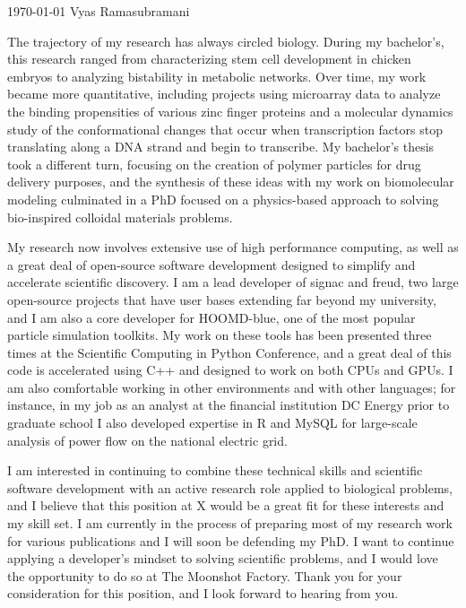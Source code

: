 \documentclass[11pt, a4paper]{awesome-cv}
\begin{document}
\makecvheader[R]

\makecvfooter
  {\today}
  {Vyas Ramasubramani}
  {}

\makelettertitle

\begin{cvletter}
    The trajectory of my research has always circled biology.
    During my bachelor's, this research ranged from characterizing stem cell development in chicken embryos to analyzing bistability in metabolic networks.
    Over time, my work became more quantitative, including projects using microarray data to analyze the binding propensities of various zinc finger proteins and a molecular dynamics study of the conformational changes that occur when transcription factors stop translating along a DNA strand and begin to transcribe.
    My bachelor's thesis took a different turn, focusing on the creation of polymer particles for drug delivery purposes, and the synthesis of these ideas with my work on biomolecular modeling culminated in a PhD focused on a physics-based approach to solving bio-inspired colloidal materials problems.

    My research now involves extensive use of high performance computing, as well as a great deal of open-source software development designed to simplify and accelerate scientific discovery.
    I am a lead developer of signac and freud, two large open-source projects that have user bases extending far beyond my university, and I am also a core developer for HOOMD-blue, one of the most popular particle simulation toolkits.
    My work on these tools has been presented three times at the Scientific Computing in Python Conference, and a great deal of this code is accelerated using C++ and designed to work on both CPUs and GPUs.
    I am also comfortable working in other environments and with other languages; for instance, in my job as an analyst at the financial institution DC Energy prior to graduate school I also developed expertise in R and MySQL for large-scale analysis of power flow on the national electric grid.

    I am interested in continuing to combine these technical skills and scientific software development with an active research role applied to biological problems, and I believe that this position at X would be a great fit for these interests and my skill set.
    I am currently in the process of preparing most of my research work for various publications and I will soon be defending my PhD.
    I want to continue applying a developer's mindset to solving scientific problems, and I would love the opportunity to do so at The Moonshot Factory.
    Thank you for your consideration for this position, and I look forward to hearing from you.
\end{cvletter}


\makeletterclosing
\end{document}
